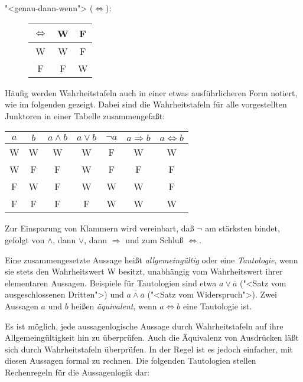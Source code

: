 \begin{description}
\item["<genau-dann-wenn"> ($\Leftrightarrow$):]
\hspace{2em}\begin{tabular}{c||c|c}
$\Leftrightarrow$     &  W   &  F \\ \hline \hline
    W      &  W   &  F \\ \hline
    F      &  F   &  W 
\end{tabular}
\end{description}

Häufig werden Wahrheitstafeln auch in einer etwas
ausführlicheren Form notiert, wie im folgenden gezeigt.  Dabei sind die
Wahrheitstafeln für alle vorgestellten Junktoren in einer Tabelle
zusammengefaßt:

\begin{center}
\begin{tabular}{c|c||c|c|c|c|c}
$a$ & $b$ & $a\wedge b$ & $a\vee b$ & $\neg a$ & $a\Rightarrow b$ & $a\Leftrightarrow b$\\ \hline\hline
W   &  W  &     W       &     W     &    F     &         W        & W\\ \hline
W   &  F  &     F       &     W     &    F     &         F        & F\\ \hline
F   &  W  &     F       &     W     &    W     &         W        & F\\ \hline
F   &  F  &     F       &     F     &    W     &         W        & W
\end{tabular}
\end{center}
%
Zur Einsparung von Klammern wird vereinbart, daß $\neg$ am stärksten 
\label{prio}
bindet, gefolgt von $\wedge$, dann $\vee$, dann $\Rightarrow$ und zum Schluß 
$\Leftrightarrow$.

Eine zusammengesetzte Aussage heißt \emph{allgemeingültig} oder eine
\emph{Tautologie}, 
wenn sie stets den Wahrheitswert W besitzt, unabhängig vom
Wahr\-heits\-wert ihrer elementaren  Aussagen. Beispiele für Tautologien sind
etwa $a \vee \overline{a}$ ("<Satz vom ausgeschlossenen Dritten">)
und $\overline{a \wedge \overline{a}}$ ("<Satz vom Widerspruch">). Zwei 
Aussagen
$a$ und $b$ heißen \emph{äquivalent}, wenn $a \Leftrightarrow b$ eine
Tautologie ist.

Es ist möglich, jede aussagenlogische Aussage durch
Wahrheitstafeln auf ihre Allgemeingültigkeit hin zu überprüfen.  Auch
die Äquivalenz von Ausdrücken läßt sich durch Wahrheitstafeln
überprüfen.  In der Regel ist es jedoch einfacher, mit diesen
Aussagen formal zu rechnen.
Die folgenden Tautologien stellen Rechenregeln für die Aussagenlogik
dar:

